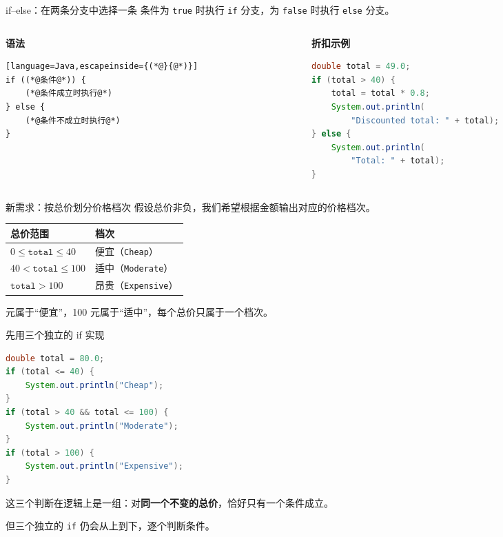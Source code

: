 \documentclass[aspectratio=169]{beamer}
\begin{document}
\begin{frame}[fragile]{if--else：在两条分支中选择一条}
  条件为 \texttt{true} 时执行 \texttt{if} 分支，为 \texttt{false} 时执行 \texttt{else} 分支。
  \par\medskip
  \begin{columns}[T,onlytextwidth]
    \begin{column}{0.35\textwidth}
      \textbf{语法}
  \begin{lstlisting}[language=Java,escapeinside={(*@}{@*)}]
if ((*@条件@*)) {
    (*@条件成立时执行@*)
} else {
    (*@条件不成立时执行@*)
}
  \end{lstlisting}
    \end{column}
    \begin{column}{0.62\textwidth}
      \textbf{折扣示例}
  \begin{lstlisting}[language=Java]
double total = 49.0;
if (total > 40) {
    total = total * 0.8;
    System.out.println(
        "Discounted total: " + total);
} else {
    System.out.println(
        "Total: " + total);
}
  \end{lstlisting}
    \end{column}
  \end{columns}
\end{frame}

\begin{frame}{新需求：按总价划分价格档次}
  假设总价非负，我们希望根据金额输出对应的价格档次。
  \par\bigskip
  \begin{center}
    \renewcommand{\arraystretch}{1.4}
    \begin{tabular}{ll}
      \textbf{总价范围} & \textbf{档次} \\
      \hline
      $0 \leq \texttt{total} \leq 40$ & 便宜（\texttt{Cheap}） \\
      $40 < \texttt{total} \leq 100$ & 适中（\texttt{Moderate}） \\
      $\texttt{total} > 100$ & 昂贵（\texttt{Expensive}） \\
    \end{tabular}
  \end{center}
   元属于“便宜”，100 元属于“适中”，每个总价只属于一个档次。
\end{frame}

\begin{frame}[fragile]{先用三个独立的 if 实现}
  \begin{lstlisting}[language=Java]
double total = 80.0;
if (total <= 40) {
    System.out.println("Cheap");
}
if (total > 40 && total <= 100) {
    System.out.println("Moderate");
}
if (total > 100) {
    System.out.println("Expensive");
}
  \end{lstlisting}
  这三个判断在逻辑上是一组：对\textbf{同一个不变的总价}，恰好只有一个条件成立。
  \par\medskip
  但三个独立的 \texttt{if} 仍会从上到下，逐个判断条件。
\end{frame}
\end{document}
